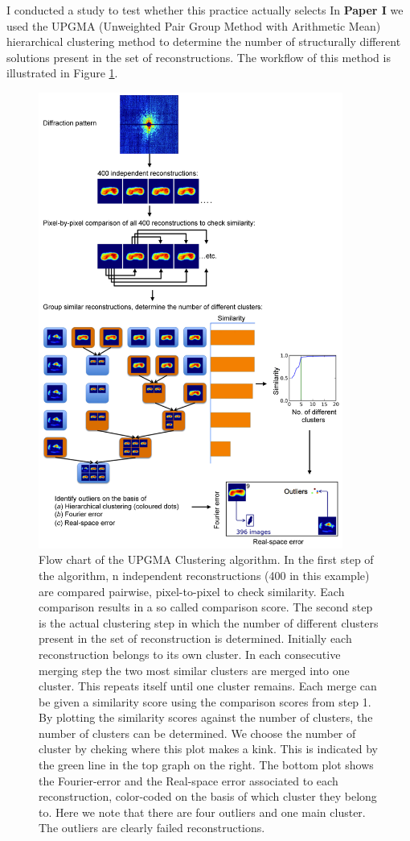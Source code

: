 I conducted a study to test whether this practice actually selects
In \textbf{Paper I} we used the  UPGMA (Unweighted Pair Group Method with Arithmetic Mean) hierarchical clustering method \cite{Sokal1958} to determine the number of structurally different solutions present in the set of reconstructions. The workflow of this method is illustrated in Figure \ref{fig:UPGMA}.

\begin{figure}[h]
	\centering 
		\includegraphics[width=100mm]{Chapter_06_UPGMAClustering.jpg}
	\caption{Flow chart of the UPGMA Clustering algorithm. In the first step of the algorithm, n independent reconstructions (400 in this example) are compared pairwise, pixel-to-pixel to check similarity. Each comparison results in a so called comparison score. The second step is the actual clustering step in which the number of different clusters present in the set of reconstruction is determined. Initially each reconstruction belongs to its own cluster. In each consecutive merging step the two most similar clusters are merged into one cluster. This repeats itself until one cluster remains. Each merge can be given a similarity score using the comparison	scores from step 1. By plotting the similarity scores against the number of clusters, the number of clusters can be determined. We choose the number of cluster by cheking where this plot makes a kink. This is indicated by the green line in the top graph on the right. The bottom plot shows the Fourier-error and the Real-space error associated to each reconstruction, color-coded on the basis of which cluster they belong to. Here we note that there are four outliers and one main cluster. The outliers are clearly failed reconstructions.}
	\label{fig:UPGMA}
\end{figure}

